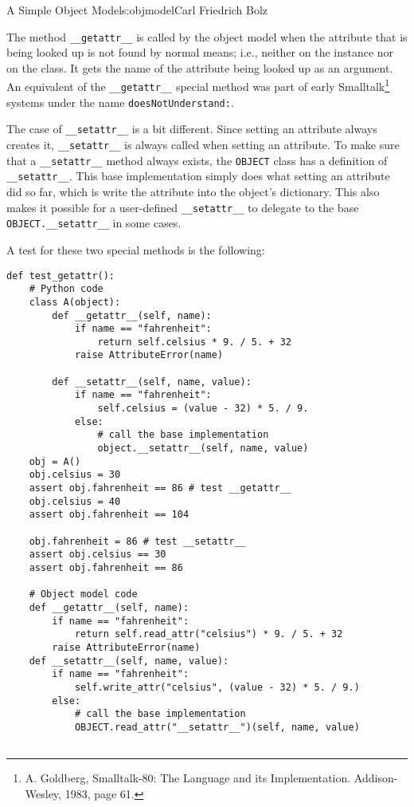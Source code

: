 \begin{aosachapter}{A Simple Object Model}{s:objmodel}{Carl Friedrich Bolz}
\label{customizing-reading-and-writing-and-attribute}

The method \texttt{\_\_getattr\_\_} is called by the object model when
the attribute that is being looked up is not found by normal means;
i.e., neither on the instance nor on the class. It gets the name of the
attribute being looked up as an argument. An equivalent of the
\texttt{\_\_getattr\_\_} special method was part of early
Smalltalk\footnote{A. Goldberg, Smalltalk-80: The Language and its
  Implementation. Addison-Wesley, 1983, page 61.} systems under the name
\texttt{doesNotUnderstand:}.

The case of \texttt{\_\_setattr\_\_} is a bit different. Since setting
an attribute always creates it, \newline \texttt{\_\_setattr\_\_} is
always called when setting an attribute. To make sure that a
\texttt{\_\_setattr\_\_} method always exists, the \texttt{OBJECT} class
has a definition of \texttt{\_\_setattr\_\_}. This base implementation
simply does what setting an attribute did so far, which is write the
attribute into the object's dictionary. This also makes it possible for
a user-defined \texttt{\_\_setattr\_\_} to delegate to the base
\texttt{OBJECT.\_\_setattr\_\_} in some cases.

A test for these two special methods is the following:

\begin{verbatim}
def test_getattr():
    # Python code
    class A(object):
        def __getattr__(self, name):
            if name == "fahrenheit":
                return self.celsius * 9. / 5. + 32
            raise AttributeError(name)

        def __setattr__(self, name, value):
            if name == "fahrenheit":
                self.celsius = (value - 32) * 5. / 9.
            else:
                # call the base implementation
                object.__setattr__(self, name, value)
    obj = A()
    obj.celsius = 30
    assert obj.fahrenheit == 86 # test __getattr__
    obj.celsius = 40
    assert obj.fahrenheit == 104

    obj.fahrenheit = 86 # test __setattr__
    assert obj.celsius == 30
    assert obj.fahrenheit == 86

    # Object model code
    def __getattr__(self, name):
        if name == "fahrenheit":
            return self.read_attr("celsius") * 9. / 5. + 32
        raise AttributeError(name)
    def __setattr__(self, name, value):
        if name == "fahrenheit":
            self.write_attr("celsius", (value - 32) * 5. / 9.)
        else:
            # call the base implementation
            OBJECT.read_attr("__setattr__")(self, name, value)


\end{verbatim}
\end{aosachapter}
